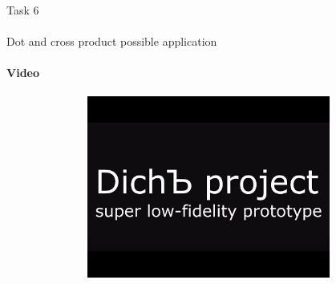 \documentclass[aspectratio=169,notes]{beamer}
\begin{document}
\begin{frame}[t]{Task 6}
    \framesubtitle{}
\end{frame}

\begin{frame}[t]{Dot and cross product possible application}
    \framesubtitle{Video}
    \vspace{-0.6cm}
    \begin{figure}[H]
        \href{http://www.youtube.com/watch?v=_PZ8V1ZDAc8}{
            \centering\includegraphics[height=6cm,width=1\textwidth,keepaspectratio]{resources/image31.jpg}}
        \label{fig:resources/image31.jpg}
    \end{figure}
\end{frame}
\end{document}
